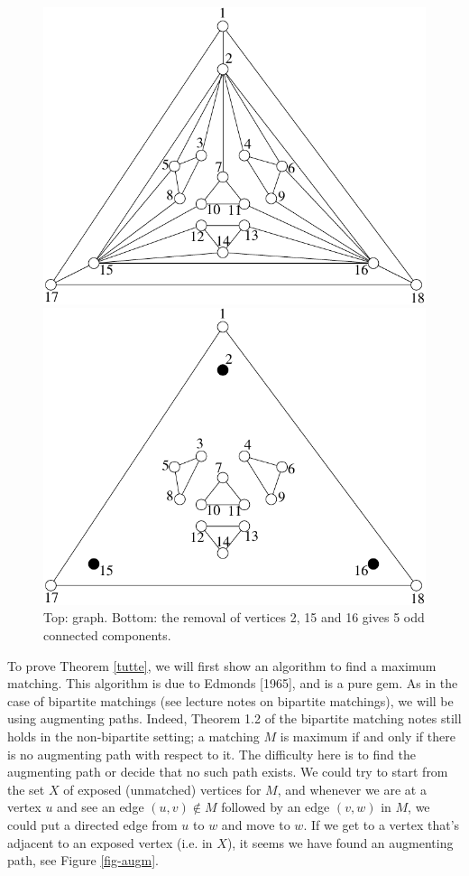 \documentclass[12pt]{article}
\begin{document}
\begin{figure}[htbp]
\begin{center}
\includegraphics{../figures/matching}

\includegraphics{../figures/matching1}
\end{center}
\caption{\label{fig-matching} Top: graph. Bottom: the removal of
  vertices 2, 15 and 16 gives 5 odd connected components.}
\end{figure}

  
To prove Theorem \ref{tutte}, we will first show an algorithm to find a
maximum matching. This algorithm is due to Edmonds [1965], and is a
pure gem.  As in the case of bipartite matchings (see lecture notes on
bipartite matchings), we will be using augmenting paths. Indeed,
Theorem 1.2 of the bipartite matching notes still holds in the
non-bipartite setting; a matching $M$ is maximum if and only if there
is no augmenting path with respect to it. The difficulty here is to
find the augmenting path or decide that no such path exists. We could
try to start from the set $X$ of exposed (unmatched) vertices for $M$,
and whenever we are at a vertex $u$ and see an edge $(u,v)\notin M$
followed by an edge $(v,w)$ in $M$, we could put a directed edge from
$u$ to $w$ and move to $w$. If we get to a vertex that's adjacent to
an exposed vertex (i.e. in $X$), it seems we have found an augmenting
path, see Figure \ref{fig-augm}. 
\end{document}

